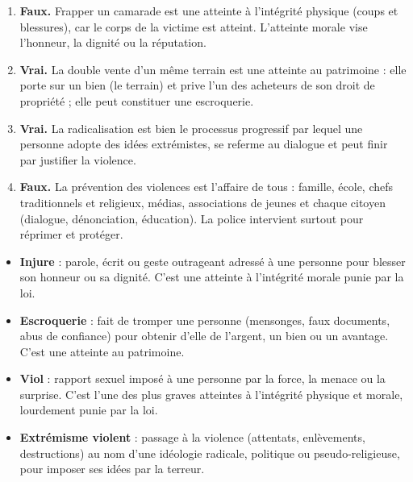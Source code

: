 \documentclass[11pt]{article}
\newcommand{\cle}[1]{{\popxbold\color{popdark}#1}}
\begin{document}
\begin{corrige}
\begin{enumerate}
\item \textbf{Faux.} Frapper un camarade est une atteinte à l'intégrité \cle{physique} (coups et blessures), car le corps de la victime est atteint. L'atteinte morale vise l'honneur, la dignité ou la réputation.
\item \textbf{Vrai.} La double vente d'un même terrain est une atteinte au \cle{patrimoine} : elle porte sur un bien (le terrain) et prive l'un des acheteurs de son droit de propriété ; elle peut constituer une escroquerie.
\item \textbf{Vrai.} La \cle{radicalisation} est bien le processus progressif par lequel une personne adopte des idées extrémistes, se referme au dialogue et peut finir par justifier la violence.
\item \textbf{Faux.} La prévention des violences est l'affaire de tous : famille, école, chefs traditionnels et religieux, médias, associations de jeunes et chaque citoyen (dialogue, dénonciation, éducation). La police intervient surtout pour réprimer et protéger.
\end{enumerate}
\end{corrige}

\begin{corrige}
\begin{itemize}
\item \textbf{\cle{Injure}} : parole, écrit ou geste outrageant adressé à une personne pour blesser son honneur ou sa dignité. C'est une atteinte à l'intégrité morale punie par la loi.
\item \textbf{\cle{Escroquerie}} : fait de tromper une personne (mensonges, faux documents, abus de confiance) pour obtenir d'elle de l'argent, un bien ou un avantage. C'est une atteinte au patrimoine.
\item \textbf{\cle{Viol}} : rapport sexuel imposé à une personne par la force, la menace ou la surprise. C'est l'une des plus graves atteintes à l'intégrité physique et morale, lourdement punie par la loi.
\item \textbf{\cle{Extrémisme violent}} : passage à la violence (attentats, enlèvements, destructions) au nom d'une idéologie radicale, politique ou pseudo-religieuse, pour imposer ses idées par la terreur.
\end{itemize}
\end{corrige}
\end{document}

